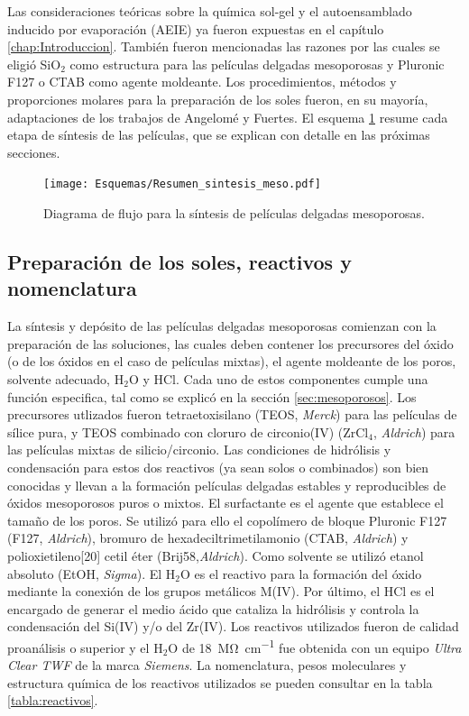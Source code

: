 	 Las consideraciones teóricas sobre la química sol-gel y el autoensamblado inducido por evaporación (AEIE) ya fueron expuestas en el capítulo \ref{chap:Introduccion}. También fueron mencionadas las razones por las cuales se eligió SiO$_2$ como estructura para las películas delgadas mesoporosas y Pluronic F127 o CTAB como agente moldeante. Los procedimientos, métodos y proporciones molares para la preparación de los soles fueron, en su mayoría, adaptaciones de los trabajos de Angelomé\cite{Angelome2008} y Fuertes\cite{Fuertes2009}. El esquema \ref{esq:peliculas_meso} resume cada etapa de síntesis de las películas, que se explican con detalle en las próximas secciones.
		  \begin{figure}[ht]
			  \begin{center}
			  \texttt{[image: Esquemas/Resumen\_sintesis\_meso.pdf]}
			  \caption[Síntesis de películas delgadas mesoporosas]{Diagrama de flujo para la síntesis de películas delgadas mesoporosas.}
			  \label{esq:peliculas_meso}
			  \end{center}
			  \end{figure}
			  \vspace*{-0.2cm}

	\subsection{Preparación de los soles, reactivos y nomenclatura}\label{sec:soles}
		
			La síntesis y depósito de las películas delgadas mesoporosas comienzan con la preparación de las soluciones, las cuales deben contener los precursores del óxido (o de los óxidos en el caso de películas mixtas), el agente moldeante de los poros, solvente adecuado, H$_2$O y HCl\cite{Brinker1990}. Cada uno de estos componentes cumple una función especifica, tal como se explicó en la sección \ref{sec:mesoporosos}. Los precursores utlizados fueron tetraetoxisilano (TEOS, \textit{Merck}) para las películas de sílice pura, y TEOS combinado con cloruro de circonio(IV) (ZrCl$_4$, \textit{Aldrich}) para las películas mixtas de silicio/circonio. Las condiciones de hidrólisis y condensación para estos dos reactivos (ya sean solos o combinados) son bien conocidas y llevan a la formación películas delgadas estables y reproducibles de óxidos mesoporosos puros o mixtos\cite{Soler-Illia2004,Crepaldi2002a,Angelome2008}. El surfactante es el agente que establece el tamaño de los poros. Se utilizó para ello el copolímero de bloque Pluronic F127 (F127, \textit{Aldrich}), bromuro de hexadeciltrimetilamonio (CTAB, \textit{Aldrich}) y polioxietileno[20] cetil éter (Brij58,\textit{Aldrich}). Como solvente se utilizó etanol absoluto (EtOH, \textit{Sigma}). El H$_2$O es el reactivo para la formación del óxido mediante la conexión de los grupos metálicos M(IV). Por último, el HCl es el encargado de generar el medio ácido que cataliza la hidrólisis y controla la condensación del Si(IV) y/o del Zr(IV). Los reactivos utilizados fueron de calidad proanálisis o superior y el H$_2$O de \SI{18}{\mega\ohm\per\cm} fue obtenida con un equipo \textit{Ultra Clear TWF} de la marca \textit{Siemens}. La nomenclatura, pesos moleculares y estructura química de los reactivos utilizados se pueden consultar en la tabla \ref{tabla:reactivos}.
					
